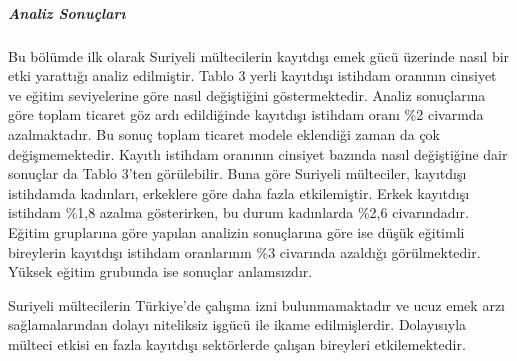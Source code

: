 \documentclass{article}
\begin{document}
    \newpage
    \subparagraph*{Analiz Sonuçları}
    \begin{justify}
    \setlength{\parindent}{0em}

    Bu bölümde ilk olarak Suriyeli mültecilerin kayıtdışı emek gücü üzerinde nasıl bir etki
    yarattığı analiz edilmiştir. Tablo 3 yerli kayıtdışı istihdam oranının cinsiyet ve eğitim seviyelerine
    göre nasıl değiştiğini göstermektedir. Analiz sonuçlarına göre toplam ticaret göz ardı edildiğinde
    kayıtdışı istihdam oranı \%2 civarında azalmaktadır. Bu sonuç toplam ticaret modele eklendiği 
    zaman da çok değişmemektedir. Kayıtlı istihdam oranının cinsiyet bazında nasıl değiştiğine dair 
    sonuçlar da Tablo 3'ten görülebilir. Buna göre Suriyeli mülteciler, kayıtdışı istihdamda kadınları,
    erkeklere göre daha fazla etkilemiştir. Erkek kayıtdışı istihdam \%1,8 
    azalma gösterirken, bu durum kadınlarda \%2,6 civarındadır. Eğitim gruplarına göre yapılan 
    analizin sonuçlarına göre ise düşük eğitimli bireylerin kayıtdışı istihdam oranlarının \%3 civarında
    azaldığı görülmektedir. Yüksek eğitim grubunda ise sonuçlar anlamsızdır. 
    
    Suriyeli mültecilerin Türkiye'de çalışma izni bulunmamaktadır ve ucuz emek arzı sağlamalarından dolayı niteliksiz 
    işgücü ile ikame edilmişlerdir. Dolayısıyla mülteci etkisi en fazla kayıtdışı sektörlerde çalışan bireyleri 
    etkilemektedir.
    

\end{justify}
\end{document}

